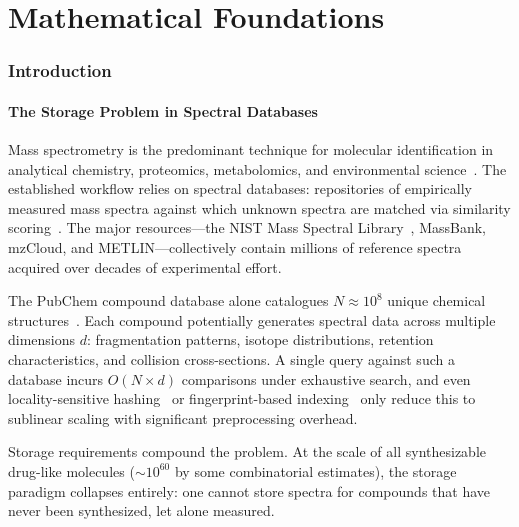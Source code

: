 \documentclass[11pt,twocolumn,a4paper]{article}
\theoremstyle{definition}
\theoremstyle{remark}
\begin{document}
\part{Mathematical Foundations}
\label{part:foundations}

\section{Introduction}
\label{sec:introduction}

\subsection{The Storage Problem in Spectral Databases}
\label{sec:storage-problem}

Mass spectrometry is the predominant technique for molecular identification in analytical chemistry, proteomics, metabolomics, and environmental science~\citep{gross2017}. The established workflow relies on spectral databases: repositories of empirically measured mass spectra against which unknown spectra are matched via similarity scoring~\citep{stein1994}. The major resources---the NIST Mass Spectral Library~\citep{linstrom2023}, MassBank, mzCloud, and METLIN---collectively contain millions of reference spectra acquired over decades of experimental effort.

The PubChem compound database alone catalogues $N \approx 10^8$ unique chemical structures~\citep{kim2023}. Each compound potentially generates spectral data across multiple dimensions $d$: fragmentation patterns, isotope distributions, retention characteristics, and collision cross-sections. A single query against such a database incurs $O(N \times d)$ comparisons under exhaustive search, and even locality-sensitive hashing~\citep{indyk1998} or fingerprint-based indexing~\citep{rogers2010, riniker2013} only reduce this to sublinear scaling with significant preprocessing overhead.

Storage requirements compound the problem. At the scale of all synthesizable drug-like molecules ($\sim 10^{60}$ by some combinatorial estimates), the storage paradigm collapses entirely: one cannot store spectra for compounds that have never been synthesized, let alone measured.
\end{document}
